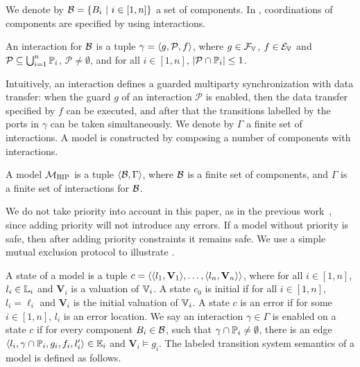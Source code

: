 We denote by $\mathcal{B} = \{B_{i} ~|~ i\in [1,n]\}$ a set of components.
%
In \BIP, coordinations of components are specified by using interactions.

\begin{definition} [Interaction]
\label{interaction}
An interaction for $\mathcal{B} $ is a tuple $\gamma = \langle{g, \mathcal{P}, f }\rangle $,
where $g \in \mathcal{F}_{\mathbb{V}_{}}$, $f\in \mathcal{E}_{\mathbb{V}_{}}$ and
$\mathcal{P} \subseteq \bigcup_{i=1}^n \mathbb{P}_{i}$, $\mathcal{P} \neq \emptyset$, and
for all $i \in [1, n]$, $|\mathcal{P} \cap \mathbb{P}_{i}| \le 1$.
\end{definition}

Intuitively, an interaction defines a guarded multiparty synchronization with data transfer:
when the guard $g$ of an interaction $\mathcal{P}$ is enabled,
then the data transfer specified by $f$ can be executed, and
after that the transitions labelled by the ports in $\gamma$ can be taken simultaneously.
%
We denote by $\Gamma$ a finite set of interactions.
A \BIP model is constructed by composing a number of components with interactions.

\begin{definition} 
A \BIP model $\mathcal{M}_{\textsc{BIP}}$ is a tuple $\langle{\ensuremath{\mathcal{B}},\Gamma}\rangle$,
 where $\mathcal{B}$ is a finite set of components,
 and $\Gamma$ is a finite set of interactions for $\mathcal{B}$.
\end{definition}

We do not take priority into account in this paper, as in the previous work~\cite{dfinder10,tgc15},
 since adding priority will not introduce any errors.
 If a model without priority is safe, then after adding priority constraints it remains safe.
 We use a simple mutual exclusion protocol to illustrate \BIP.

%

A state of a \BIP model is a tuple $c = \langle \langle l_{1}, \mathbf{V}_{1} \rangle, \ldots, \langle l_{n}, \mathbf{V}_{n} \rangle \rangle $,
 where for all $i \in [1,n] $, $l_i \in \mathbb{L}_{i} $ and $\mathbf{V}_i $ is a valuation of $\mathbb{V}_{i}$.
%
A state $c_{0}$ is initial if for all $i \in [1,n]$,
$l_i = \ell_{i}$ and $\mathbf{V}_{i}$ is the initial valuation of $\mathbb{V}_{i}$.
%
A state $c$ is an error if for some $i \in [1,n]$, $l_{i}$ is an error location.
%
We say an interaction $\gamma \in \Gamma$ is enabled on a state $c$ if
 for every component $B_{i} \in \mathcal{B}$,
 such that $\gamma \cap \mathbb{P}_{i} \neq \emptyset$,
%
 there is an edge $\langle{l_i, \gamma \cap \ensuremath{\mathbb{P}_{i}}, g_i, f_i, l_{i}' }\rangle \in \mathbb{E}_{i}$
 and  $\mathbf{V}_{i} \models g_i $.
%
The labeled transition system semantics of a \BIP model is defined as follows.

